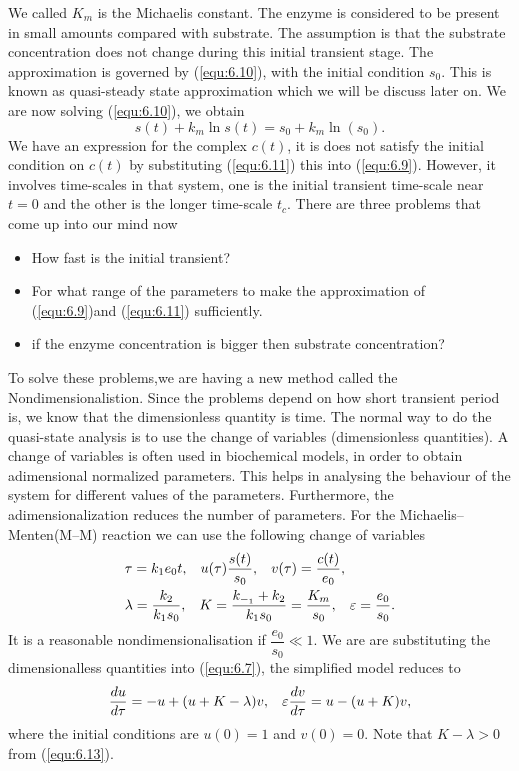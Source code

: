 \documentclass[a4paper]{report}
\theoremstyle{definition}
\begin{document}
We called $K_m$ is the Michaelis constant.
The enzyme is considered to be present in small amounts compared with substrate. The assumption is that the substrate concentration does not change during  this initial transient stage. The approximation is governed by (\ref{equ:6.10}), with the initial condition $s_0$. This is known as quasi-steady state approximation which we will be discuss later on. We are now solving (\ref{equ:6.10}), we obtain
\begin{equation}
\label{equ:6.11}
s(t)+k_m \ln s(t)=s_0+k_m \ln(s_0).
\end{equation}
We have an expression for the complex $c(t)$, it is does not satisfy the initial condition on $c(t)$ by substituting (\ref{equ:6.11}) this into (\ref{equ:6.9}). However, it involves time-scales in that system, one is the initial transient time-scale near $t=0$ and the other is the longer time-scale $t_c$. There are three problems that come up into our mind now
\begin{itemize}
  \item How fast is the initial transient?
  \item For what range of the parameters to make the approximation of (\ref{equ:6.9})and (\ref{equ:6.11}) sufficiently.
  \item if the enzyme concentration is bigger then substrate concentration?
\end{itemize}
To solve these problems,we are having a new method called the Nondimensionalistion.  Since the problems depend on how short transient period is, we know that the dimensionless quantity is time. The normal way to do the quasi-state analysis is to use the change of variables (dimensionless quantities). A change of variables is often used in biochemical models, in order to obtain adimensional normalized parameters. This helps in analysing the behaviour of the system for different values of the
parameters. Furthermore, the adimensionalization  reduces the number of parameters. For the Michaelis–Menten(M–M) reaction we can use the following change of variables
\smallskip
\begin{align}
\label{equ:6.12}
\begin{split}
&\tau=k_1e_0t, \hspace{3mm} u(\tau)\dfrac{s(t)}{s_0},\hspace{3mm}  v(\tau)=\dfrac{c(t)}{e_0},
\\
&\lambda=\dfrac{k_2}{k_1s_0}, \hspace{3mm} K=\dfrac{k_{-_1}+k_2}{k_1s_0}=\dfrac{K_m}{s_0}, \hspace{3mm} \varepsilon=\dfrac{e_0}{s_0}.
\end{split}
\end{align}
It is a reasonable nondimensionalisation if $\dfrac{e_0}{s_0}\ll1$.
We are are substituting the dimensionalless quantities into (\ref{equ:6.7}), the simplified model reduces to
\begin{equation}
\label{equ:6.13}
\dfrac{du}{d\tau}=-u+(u+K-\lambda)v, \hspace{3mm} \varepsilon\dfrac{dv}{d\tau}=u-(u+K)v,
\end{equation}
where the initial conditions are $u(0)=1$ and $v(0)=0$. 
Note that $K-\lambda>0$ from (\ref{equ:6.13}).
\end{document}
